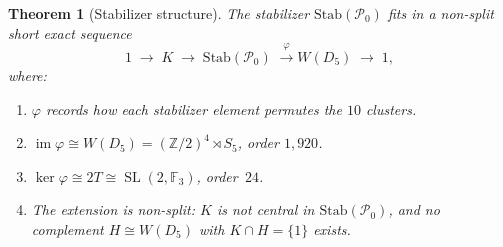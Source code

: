 \documentclass[11pt,reqno]{amsart}
\theoremstyle{plain}
\newtheorem{theorem}{Theorem}[section]
\theoremstyle{definition}
\theoremstyle{remark}
\newcommand{\Z}{\mathbb{Z}}
\newcommand{\F}{\mathbb{F}}
\newcommand{\Stab}{\mathrm{Stab}}
\DeclareMathOperator{\SL}{SL}
\begin{document}
\begin{theorem}[Stabilizer structure]\label{thm:stab}
The stabilizer $\Stab(\mathcal{P}_0)$ fits in a non-split
short exact sequence
\begin{equation}\label{eq:ses}
  1 \;\longrightarrow\; K \;\longrightarrow\;
  \Stab(\mathcal{P}_0) \;\xrightarrow{\;\varphi\;}
  W(D_5) \;\longrightarrow\; 1,
\end{equation}
where:
\begin{enumerate}[label=(\roman*)]
\item $\varphi$ records how each stabilizer element permutes
  the $10$ clusters.
\item $\operatorname{im}\varphi \cong W(D_5)
  = (\Z/2)^4 \rtimes S_5$, order $1{,}920$.
\item $\ker\varphi \cong 2T \cong \SL(2,\F_3)$, order~$24$.
\item The extension is non-split:
  $K$ is not central in $\Stab(\mathcal{P}_0)$,
  and no complement $H \cong W(D_5)$ with $K \cap H = \{1\}$
  exists.
\end{enumerate}
\end{theorem}
\end{document}
